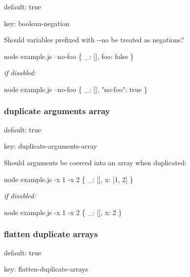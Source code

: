 \begin{DoxyItemize}
\item default\+: {\ttfamily true}
\item key\+: {\ttfamily boolean-\/negation}
\end{DoxyItemize}

Should variables prefixed with {\ttfamily -\/-\/no} be treated as negations?


\begin{DoxyCode}
node example.js --no-foo
\{ \_: [], foo: false \}
\end{DoxyCode}


{\itshape if disabled\+:}


\begin{DoxyCode}
node example.js --no-foo
\{ \_: [], "no-foo": true \}
\end{DoxyCode}


\subsubsection*{duplicate arguments array}


\begin{DoxyItemize}
\item default\+: {\ttfamily true}
\item key\+: {\ttfamily duplicate-\/arguments-\/array}
\end{DoxyItemize}

Should arguments be coerced into an array when duplicated\+:


\begin{DoxyCode}
node example.js -x 1 -x 2
\{ \_: [], x: [1, 2] \}
\end{DoxyCode}


{\itshape if disabled\+:}


\begin{DoxyCode}
node example.js -x 1 -x 2
\{ \_: [], x: 2 \}
\end{DoxyCode}


\subsubsection*{flatten duplicate arrays}


\begin{DoxyItemize}
\item default\+: {\ttfamily true}
\item key\+: {\ttfamily flatten-\/duplicate-\/arrays}
\end{DoxyItemize}

